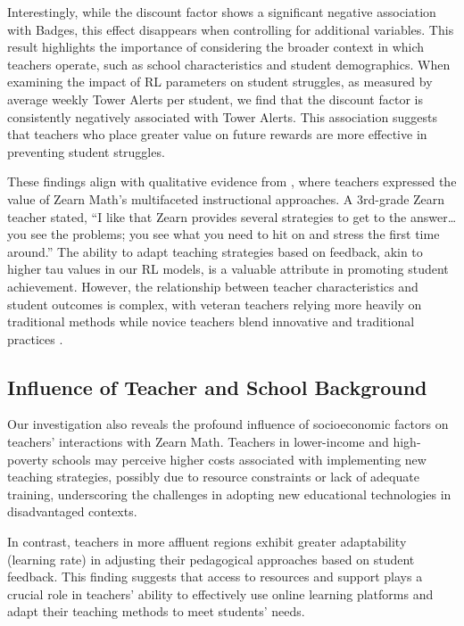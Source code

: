 \documentclass[
  number,
  preprint,
  3p,
  onecolumn]{elsarticle}
\begin{document}
Interestingly, while the discount factor shows a significant negative
association with Badges, this effect disappears when controlling for
additional variables. This result highlights the importance of
considering the broader context in which teachers operate, such as
school characteristics and student demographics. When examining the
impact of RL parameters on student struggles, as measured by average
weekly Tower Alerts per student, we find that the discount factor is
consistently negatively associated with Tower Alerts. This association
suggests that teachers who place greater value on future rewards are
more effective in preventing student struggles.

These findings align with qualitative evidence from \citep{knudsen2020},
where teachers expressed the value of Zearn Math's multifaceted
instructional approaches. A 3rd-grade Zearn teacher stated, ``I like
that Zearn provides several strategies to get to the answer\ldots you
see the problems; you see what you need to hit on and stress the first
time around.'' The ability to adapt teaching strategies based on
feedback, akin to higher tau values in our RL models, is a valuable
attribute in promoting student achievement. However, the relationship
between teacher characteristics and student outcomes is complex, with
veteran teachers relying more heavily on traditional methods while
novice teachers blend innovative and traditional practices
\citep{knudsen2020}.

\subsection{Influence of Teacher and School
Background}\label{influence-of-teacher-and-school-background}

Our investigation also reveals the profound influence of socioeconomic
factors on teachers' interactions with Zearn Math. Teachers in
lower-income and high-poverty schools may perceive higher costs
associated with implementing new teaching strategies, possibly due to
resource constraints or lack of adequate training, underscoring the
challenges in adopting new educational technologies in disadvantaged
contexts.

In contrast, teachers in more affluent regions exhibit greater
adaptability (learning rate) in adjusting their pedagogical approaches
based on student feedback. This finding suggests that access to
resources and support plays a crucial role in teachers' ability to
effectively use online learning platforms and adapt their teaching
methods to meet students' needs.
\end{document}
